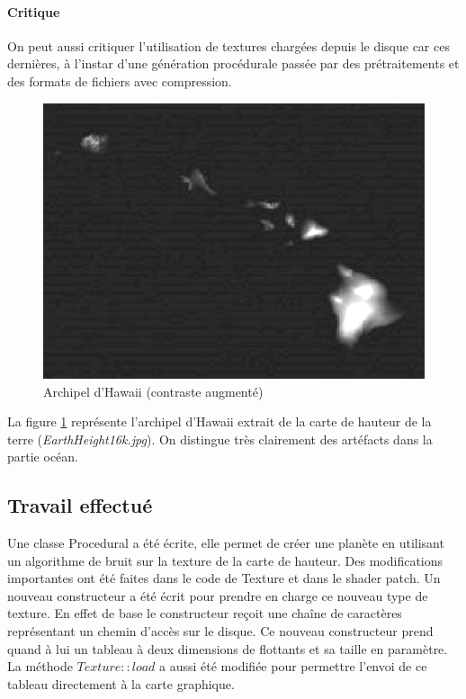     \paragraph{Critique} On peut aussi critiquer l'utilisation de textures chargées depuis le disque car ces dernières, à l'instar d'une génération procédurale passée par des prétraitements et des formats de fichiers avec compression.
    
    \begin{figure}
        \centering
        \includegraphics[width=12cm]{img/hawaii2.png}
        \caption{Archipel d'Hawaii (contraste augmenté)}
        \label{fig:hawaii}
    \end{figure}
    
    La figure \ref{fig:hawaii} représente l'archipel d'Hawaii extrait de la carte de hauteur de la terre
    (\textit{EarthHeight16k.jpg}). On distingue très clairement des artéfacts dans la partie océan.
    
    \subsection{Travail effectué}
    Une classe Procedural a été écrite, elle permet de créer une planète en utilisant un algorithme de bruit
    sur la texture de la carte de hauteur.
    Des modifications importantes ont été faites dans le code de Texture et dans le shader patch.
    Un nouveau constructeur a été écrit pour prendre en charge ce nouveau type de texture. En effet de 
    base le constructeur reçoit une chaîne de caractères représentant un chemin d'accès sur le disque.
    Ce nouveau constructeur prend quand à lui un tableau à deux dimensions de flottants et sa taille en paramètre.\\
    La méthode $Texture::load$ a aussi été modifiée pour permettre l'envoi de ce tableau directement à la carte graphique.\\
    

